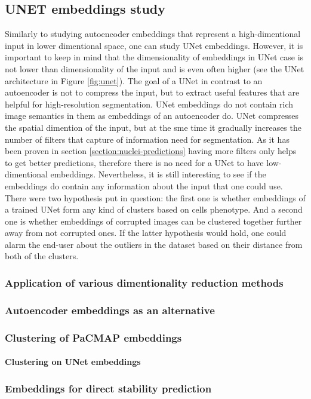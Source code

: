 \subsection{UNET embeddings study}
    Similarly to studying autoencoder embeddings that represent a high-dimentional input in lower dimentional space, one can study UNet embeddings. However, it is important to keep in mind that the dimensionality of embeddings in UNet case is not lower than dimensionality of the input and is even often higher (see the UNet architecture in Figure \ref{fig:unet}). The goal of a UNet in contrast to an autoencoder is not to compress the input, but to extract useful features that are helpful for high-resolution segmentation. UNet embeddings do not contain rich image semantics in them as embeddings of an autoencoder do. UNet compresses the spatial dimention of the input, but at the sme time it gradually increases the number of filters that capture of information need for segmentation. As it has been proven in section \ref{section:nuclei-predictions} having more filters only helps to get better predictions, therefore there is no need for a UNet to have low-dimentional embeddings. Nevertheless, it is still interesting to see if the embeddings do contain any information about the input that one could use. There were two hypothesis put in question: the first one is whether embeddings of a trained UNet form any kind of clusters based on cells phenotype. And a second one is whether embeddings of corrupted images can be clustered together further away from not corrupted ones. If the latter hypothesis would hold, one could alarm the end-user about the outliers in the dataset based on their distance from both of the clusters. 
    \subsubsection{Application of various dimentionality reduction methods}
        \label{section:unet-embeddings-dim-reduction}
        
    \subsubsection{Autoencoder embeddings as an alternative}
        
    \subsubsection{Clustering of PaCMAP embeddings}
        \paragraph{Clustering on UNet embeddings}
        \label{section:clustering-on-unet-embeddings}
        
    \subsubsection{Embeddings for direct stability prediction}
        